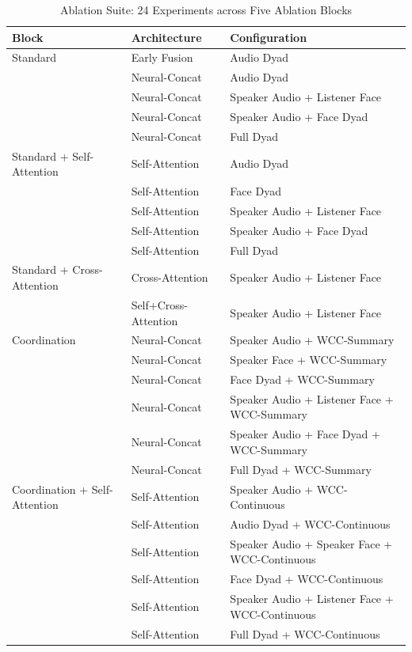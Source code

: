 \begin{table}[h]
\caption{Ablation Suite: 24 Experiments across Five Ablation Blocks}
\label{tab:ablations}
\begin{tabular}{l l l}
\toprule
Block & Architecture & Configuration \\
\midrule
Standard & Early Fusion & Audio Dyad \\
 & Neural-Concat & Audio Dyad \\
 & Neural-Concat & Speaker Audio + Listener Face \\
 & Neural-Concat & Speaker Audio + Face Dyad \\
 & Neural-Concat & Full Dyad \\
\midrule
Standard + Self-Attention & Self-Attention & Audio Dyad \\
 & Self-Attention & Face Dyad \\
 & Self-Attention & Speaker Audio + Listener Face \\
 & Self-Attention & Speaker Audio + Face Dyad \\
 & Self-Attention & Full Dyad \\
\midrule
Standard + Cross-Attention & Cross-Attention & Speaker Audio + Listener Face \\
 & Self+Cross-Attention & Speaker Audio + Listener Face \\
\midrule
Coordination & Neural-Concat & Speaker Audio + WCC-Summary \\
 & Neural-Concat & Speaker Face + WCC-Summary \\
 & Neural-Concat & Face Dyad + WCC-Summary \\
 & Neural-Concat & Speaker Audio + Listener Face + WCC-Summary \\
 & Neural-Concat & Speaker Audio + Face Dyad + WCC-Summary \\
 & Neural-Concat & Full Dyad + WCC-Summary \\
\midrule
Coordination + Self-Attention & Self-Attention & Speaker Audio + WCC-Continuous \\
 & Self-Attention & Audio Dyad + WCC-Continuous \\
 & Self-Attention & Speaker Audio + Speaker Face + WCC-Continuous \\
 & Self-Attention & Face Dyad + WCC-Continuous \\
 & Self-Attention & Speaker Audio + Listener Face + WCC-Continuous \\
 & Self-Attention & Full Dyad + WCC-Continuous \\
\bottomrule
\end{tabular}
\end{table}
